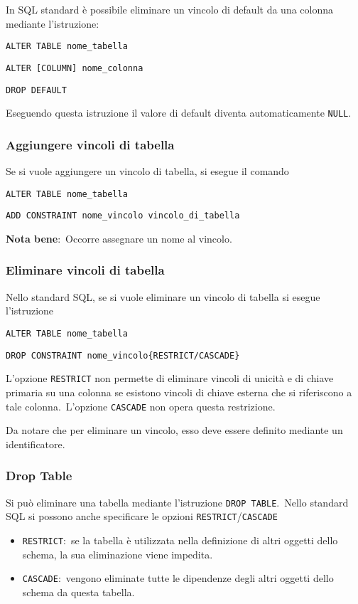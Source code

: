 In SQL standard è possibile eliminare un vincolo di default da una colonna mediante l'istruzione:
\begin{flushleft}
	\texttt{ALTER TABLE nome\_tabella}

	\texttt{ALTER [COLUMN] nome\_colonna}

	\texttt{DROP DEFAULT}
\end{flushleft}

\noindent Eseguendo questa istruzione il valore di default diventa automaticamente \texttt{NULL}.

\subsubsection{Aggiungere vincoli di tabella}

Se si vuole aggiungere un vincolo di tabella, si esegue il comando
\begin{flushleft}
	\texttt{ALTER TABLE nome\_tabella}

	\texttt{ADD CONSTRAINT nome\_vincolo vincolo\_di\_tabella  }
\end{flushleft}

\noindent\textbf{Nota bene}:\ Occorre assegnare un nome al vincolo.

\subsubsection{Eliminare vincoli di tabella}

Nello standard SQL, se si vuole eliminare un vincolo di tabella si esegue l'istruzione
\begin{flushleft}
	\texttt{ALTER TABLE nome\_tabella}

	\texttt{DROP CONSTRAINT nome\_vincolo\{RESTRICT/CASCADE\}}
\end{flushleft}

\noindent L'opzione \texttt{RESTRICT} non permette di eliminare vincoli di unicità e di chiave primaria su una colonna se esistono vincoli di chiave esterna che si riferiscono a tale colonna.\
L'opzione \texttt{CASCADE} non opera questa restrizione.\

Da notare che per eliminare un vincolo, esso deve essere definito mediante un identificatore.

\subsubsection{Drop Table}

Si può eliminare una tabella mediante l'istruzione \texttt{DROP TABLE}.\
Nello standard SQL si possono anche specificare le opzioni \texttt{RESTRICT}/\texttt{CASCADE}
\begin{itemize}
	\item \texttt{RESTRICT}:\ se la tabella è utilizzata nella definizione di altri oggetti dello schema, la sua eliminazione viene impedita.
	\item \texttt{CASCADE}:\ vengono eliminate tutte le dipendenze degli altri oggetti dello schema da questa tabella.
\end{itemize}

